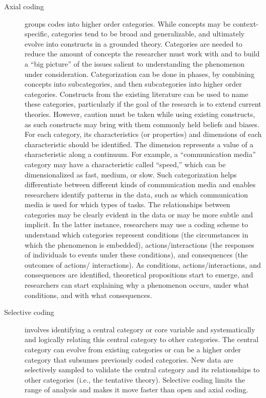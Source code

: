 \begin{description}
\item[Axial coding] groups codes into higher order categories. While concepts may be context-specific, categories tend to be broad and generalizable, and ultimately evolve into constructs in a grounded theory. Categories are needed to reduce the amount of concepts the researcher must work with and to build a ``big picture'' of the issues salient to understanding the phenomenon under consideration. Categorization can be done in phases, by combining concepts into subcategories, and then subcategories into higher order categories. Constructs from the existing literature can be used to name these categories, particularly if the goal of the research is to extend current theories. However, caution must be taken while using existing constructs, as such constructs may bring with them commonly held beliefs and biases. For each category, its characteristics (or properties) and dimensions of each characteristic should be identified. The dimension represents a value of a characteristic along a continuum. For example, a ``communication media'' category may have a characteristic called ``speed,'' which can be dimensionalized as fast, medium, or slow. Such categorization helps differentiate between different kinds of communication media and enables researchers identify patterns in the data, such as which communication media is used for which types of tasks. The relationships between categories may be clearly evident in the data or may be more subtle and implicit. In the latter instance, researchers may use a coding scheme to understand which categories represent conditions (the circumstances in which the phenomenon is embedded), actions/interactions (the responses of individuals to events under these conditions), and consequences (the outcomes of actions/ interactions). As conditions, actions/interactions, and consequences are identified, theoretical propositions start to emerge, and researchers can start explaining why a phenomenon occurs, under what conditions, and with what consequences.

\item[Selective coding] involves identifying a central category or core variable and systematically and logically relating this central category to other categories. The central category can evolve from existing categories or can be a higher order category that subsumes previously coded categories. New data are selectively sampled to validate the central category and its relationships to other categories (i.e., the tentative theory). Selective coding limits the range of analysis and makes it move faster than open and axial coding.

\end{description}

